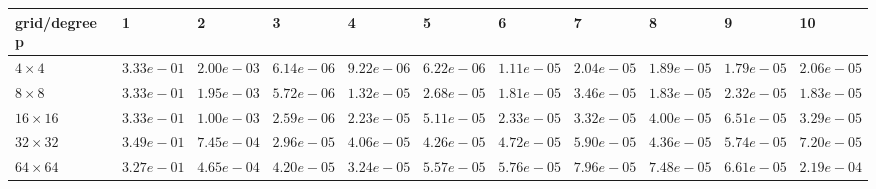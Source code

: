 \begin{tabular}{lllllllllll}
\hline
 grid/degree p   & 1          & 2          & 3          & 4          & 5          & 6          & 7          & 8          & 9          & 10         \\
\hline
 $4 \times 4$    & $3.33e-01$ & $2.00e-03$ & $6.14e-06$ & $9.22e-06$ & $6.22e-06$ & $1.11e-05$ & $2.04e-05$ & $1.89e-05$ & $1.79e-05$ & $2.06e-05$ \\
 $8 \times 8$    & $3.33e-01$ & $1.95e-03$ & $5.72e-06$ & $1.32e-05$ & $2.68e-05$ & $1.81e-05$ & $3.46e-05$ & $1.83e-05$ & $2.32e-05$ & $1.83e-05$ \\
 $16 \times 16$  & $3.33e-01$ & $1.00e-03$ & $2.59e-06$ & $2.23e-05$ & $5.11e-05$ & $2.33e-05$ & $3.32e-05$ & $4.00e-05$ & $6.51e-05$ & $3.29e-05$ \\
 $32 \times 32$  & $3.49e-01$ & $7.45e-04$ & $2.96e-05$ & $4.06e-05$ & $4.26e-05$ & $4.72e-05$ & $5.90e-05$ & $4.36e-05$ & $5.74e-05$ & $7.20e-05$ \\
 $64 \times 64$  & $3.27e-01$ & $4.65e-04$ & $4.20e-05$ & $3.24e-05$ & $5.57e-05$ & $5.76e-05$ & $7.96e-05$ & $7.48e-05$ & $6.61e-05$ & $2.19e-04$ \\
\hline
\end{tabular}